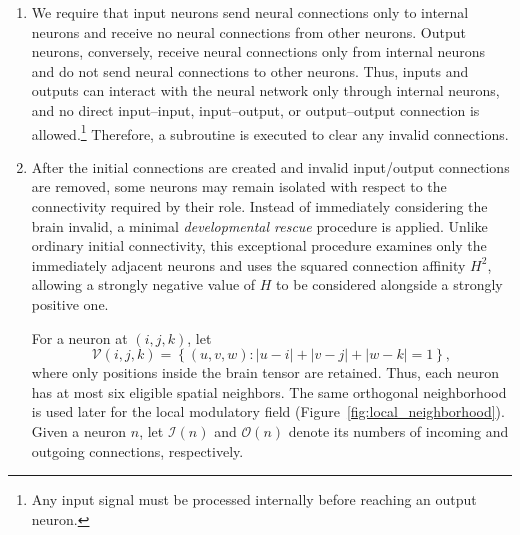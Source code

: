 \documentclass[12pt,a4paper]{article}
\begin{document}
\begin{enumerate}
	Let $\mathcal{N}_{in}$ be the set of neuron inputs, $\mathcal{N}_{out}$ be the set of neuron outputs, and $\mathcal{N}_{int}$ be the set of interior neurons (not input and not output). To assign these roles, let $x = x_0 \ldots x_{63}$ be the \emph{neuron role gene}. Then we define the \emph{neuron role map}

	\begin{equation}
	B_{i,j,k}(x)=\sin\!\left(4\pi A_{i,j,k}(x)\right).
	\label{role_order_score}
	\end{equation}
for each neuron $n(i, j, k)$.

	All $IJK$ neurons are ordered globally by increasing $B_{i,j,k}(x)$ (ties are resolved by spatial index). Following this order, the first $|\mathcal{N}_{in}|$ neurons with at least two outgoing connections are selected as inputs. Similarly, following the reverse order, the first $|\mathcal{N}_{out}|$ neurons with at least two incoming connections that have not already been selected as inputs are selected as outputs. All remaining neurons are internal. If either selection cannot provide the required number of neurons, brain construction is invalid and the brain is discarded.

	\item We require that input neurons send neural connections only to internal neurons and receive no neural connections from other neurons. Output neurons, conversely, receive neural connections only from internal neurons and do not send neural connections to other neurons. Thus, inputs and outputs can interact with the neural network only through internal neurons, and no direct input--input, input--output, or output--output connection is allowed.\footnote{Any input signal must be processed internally before reaching an output neuron.} Therefore, a subroutine is executed to clear any invalid connections. 	
	
	\item After the initial connections are created and invalid input/output connections are removed, some neurons may remain isolated with respect to the connectivity required by their role. Instead of immediately considering the brain invalid, a minimal \emph{developmental rescue} procedure is applied. Unlike ordinary initial connectivity, this exceptional procedure examines only the immediately adjacent neurons and uses the squared connection affinity $H^2$, allowing a strongly negative value of $H$ to be considered alongside a strongly positive one.

	For a neuron at $(i,j,k)$, let
	$$\mathcal{V}(i,j,k)=\left\{(u,v,w): |u-i|+|v-j|+|w-k|=1\right\},$$
	where only positions inside the brain tensor are retained. Thus, each neuron has at most six eligible spatial neighbors. The same orthogonal neighborhood is used later for the local modulatory field (Figure~\ref{fig:local_neighborhood}). Given a neuron $n$, let $\mathcal{I}(n)$ and $\mathcal{O}(n)$ denote its numbers of incoming and outgoing connections, respectively.


\end{enumerate}
\end{document}
